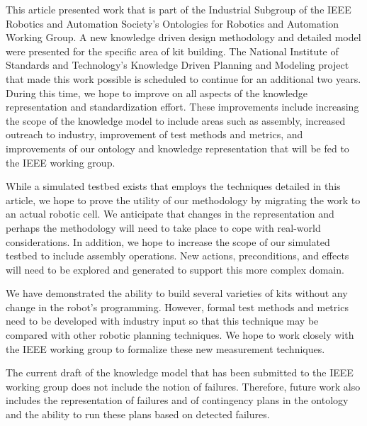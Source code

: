 This article presented work that is 
part of the Industrial Subgroup of the IEEE Robotics and
Automation Society's Ontologies for Robotics and Automation Working
Group. A new knowledge driven design methodology and detailed model were
presented for the specific area of kit building.
The National Institute of Standards and Technology's
Knowledge Driven Planning and Modeling project that made
this work possible is
scheduled to continue for an additional two years. During this
time, we hope to improve on all aspects of the knowledge
representation and standardization effort. These improvements 
include increasing the scope of the knowledge model to
include areas such as assembly, increased outreach to industry, improvement of
test methods and metrics, and improvements of our ontology
and knowledge representation that will be fed to the IEEE
working group.

While a simulated testbed exists that employs the techniques
detailed in this article, we hope to prove the utility of our
methodology by migrating the work to an actual robotic cell.
We anticipate that changes in the representation and perhaps the
methodology will need to take place to cope with real-world considerations.
In addition, we hope to increase the scope of our simulated testbed to
include assembly operations. New actions, preconditions, and effects
will need to be explored and generated to support this more
complex domain.

We have  demonstrated the ability to build several varieties 
of kits without any change in the robot's programming. However, formal
test methods and metrics need to be developed with industry input so that
this technique may be compared with other robotic planning techniques. We
hope to work closely with the IEEE working group to formalize
these new measurement techniques.

The current draft of the knowledge model that has been submitted
to the IEEE working group does not include the notion of failures.
Therefore, future work also includes the 
representation of failures and of contingency plans in the ontology and the ability 
to run these plans based on detected failures.
